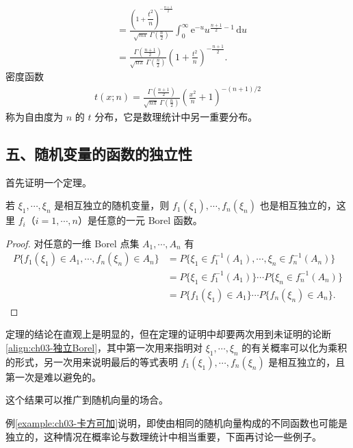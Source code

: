 \documentclass[../../main.tex]{subfiles}
\begin{document}
\begin{example}[$t$ 分布]
\begin{align*}
&=\frac{\left(1+\dfrac{t^{2}}{n}\right)^{-\frac{n+1}{2}}}{\sqrt{n\pi}\,\Gamma\!\left(\frac{n}{2}\right)}\int_{0}^{\infty}\mathrm{e}^{-u}u^{\frac{n+1}{2}-1}\,\mathrm{d}u\\
&=\frac{\Gamma\!\left(\frac{n+1}{2}\right)}{\sqrt{n\pi}\,\Gamma\!\left(\frac{n}{2}\right)}\left(1+\frac{t^{2}}{n}\right)^{-\frac{n+1}{2}}.
\end{align*}
密度函数
\begin{align}
t(x;n)=\frac{\Gamma\!\left(\frac{n+1}{2}\right)}{\sqrt{n\pi}\,\Gamma\!\left(\frac{n}{2}\right)}\left(\frac{x^{2}}{n}+1\right)^{-(n+1)/2}\label{align:ch03-t分布密度}
\end{align}
称为自由度为 $n$ 的 $t$ 分布，它是数理统计中另一重要分布。
\end{example}

\subsection*{五、随机变量的函数的独立性}

首先证明一个定理。

\begin{theorem}[独立随机变量的函数仍独立]\label{theorem:ch03-独立函数仍独立}
若 $\xi_1,\cdots,\xi_n$ 是相互独立的随机变量，则 $f_1(\xi_1),\cdots,f_n(\xi_n)$ 也是相互独立的，这里 $f_i$（$i=1,\cdots,n$）是任意的一元 Borel 函数。
\end{theorem}

\begin{proof}
对任意的一维 Borel 点集 $A_1,\cdots,A_n$ 有
\begin{align*}
P\{f_1(\xi_1)\in A_1,\cdots,f_n(\xi_n)\in A_n\}
&=P\{\xi_1\in f_1^{-1}(A_1),\cdots,\xi_n\in f_n^{-1}(A_n)\}\\
&=P\{\xi_1\in f_1^{-1}(A_1)\}\cdots P\{\xi_n\in f_n^{-1}(A_n)\}\\
&=P\{f_1(\xi_1)\in A_1\}\cdots P\{f_n(\xi_n)\in A_n\}.
\end{align*}
\end{proof}

定理的结论在直观上是明显的，但在定理的证明中却要两次用到未证明的论断\eqref{align:ch03-独立Borel}，其中第一次用来指明对 $\xi_1,\cdots,\xi_n$ 的有关概率可以化为乘积的形式，另一次用来说明最后的等式表明 $f_1(\xi_1),\cdots,f_n(\xi_n)$ 是相互独立的，且第一次是难以避免的。

这个结果可以推广到随机向量的场合。

例\ref{example:ch03-卡方可加}说明，即使由相同的随机向量构成的不同函数也可能是独立的，这种情况在概率论与数理统计中相当重要，下面再讨论一些例子。
\end{document}
